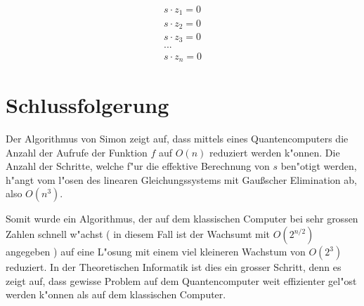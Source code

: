\begin{refsection}
\begin{align*}
    s \cdot z_{1} = 0
    \\
    s \cdot z_{2} = 0
    \\
    s \cdot z_{3} = 0
    \\
    ...
    \\
    s \cdot z_{n} = 0
\end{align*}

\section{Schlussfolgerung}

\begin{figure}[H]
\centering
{}
\end{figure}

Der Algorithmus von Simon zeigt auf, dass mittels eines Quantencomputers die
Anzahl der Aufrufe der Funktion $f$ auf $O(n)$ reduziert werden k"onnen. Die
Anzahl der Schritte, welche f"ur die effektive Berechnung von $s$ ben"otigt
werden, h"angt vom l"osen des linearen Gleichungssystems mit Gaußscher
Elimination ab, also $O(n^3)$. 
\cite{simon:cs191}

Somit wurde ein Algorithmus, der auf dem klassischen Computer bei sehr grossen
Zahlen schnell w"achst ( in diesem Fall ist der Wachsumt mit $O(2^{n/2})$
angegeben ) auf eine L"osung mit einem viel kleineren Wachstum von $O(2^3)$
reduziert. In der Theoretischen Informatik ist dies ein grosser Schritt, denn
es zeigt auf, dass gewisse Problem auf dem Quantencomputer weit effizienter
gel"ost werden k"onnen als auf dem klassischen Computer.


\printbibliography[heading=subbibliography] \end{refsection}


